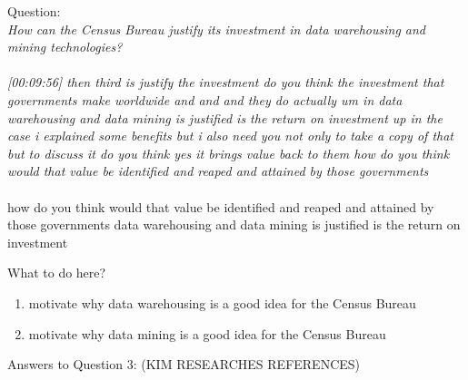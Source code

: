 Question:\\
\emph{
    How can the Census Bureau justify its investment in data warehousing and mining
technologies?
}\\\\

\emph{[00:09:56] then third is justify the investment do you think the investment that governments make worldwide
and and and they do actually um in data warehousing and data mining is justified is the return on investment
up in the case i explained some benefits but i also need you not only to take a copy of that but
to discuss it do you think yes it brings value back to them how do you think would that value be
identified and reaped and attained by those governments}\\\\
how do you think would that value be
identified and reaped and attained by those governments
data warehousing and data mining is justified is the return on investment

What to do here?
\begin{enumerate}
    \item motivate why data warehousing is a good idea for the Census Bureau
    \item motivate why data mining is a good idea for the Census Bureau
  \end{enumerate}

\newpage Answers to Question 3: (KIM RESEARCHES REFERENCES)

